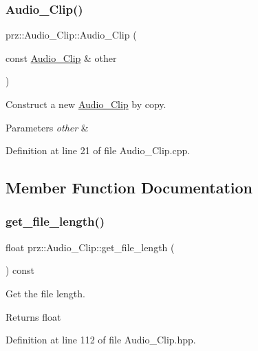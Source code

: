 \subsubsection{\texorpdfstring{Audio\_Clip()}{Audio\_Clip()}\hspace{0.1cm}{\footnotesize\ttfamily [2/2]}}
{\footnotesize\ttfamily prz\+::\+Audio\+\_\+\+Clip\+::\+Audio\+\_\+\+Clip (\begin{DoxyParamCaption}\item[{const \mbox{\hyperlink{classprz_1_1_audio___clip}{Audio\+\_\+\+Clip}} \&}]{other }\end{DoxyParamCaption})}



Construct a new \mbox{\hyperlink{classprz_1_1_audio___clip}{Audio\+\_\+\+Clip}} by copy. 


\begin{DoxyParams}{Parameters}
{\em other} & \\
\hline
\end{DoxyParams}


Definition at line 21 of file Audio\+\_\+\+Clip.\+cpp.



\subsection{Member Function Documentation}
\mbox{\label{classprz_1_1_audio___clip_aa64143bed59cae5e2809284ad5765b52}} 
\subsubsection{\texorpdfstring{get\_file\_length()}{get\_file\_length()}}
{\footnotesize\ttfamily float prz\+::\+Audio\+\_\+\+Clip\+::get\+\_\+file\+\_\+length (\begin{DoxyParamCaption}{ }\end{DoxyParamCaption}) const\hspace{0.3cm}{\ttfamily [inline]}}



Get the file length. 

\begin{DoxyReturn}{Returns}
float 
\end{DoxyReturn}


Definition at line 112 of file Audio\+\_\+\+Clip.\+hpp.

